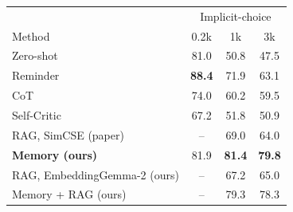 \begin{tabular}{l|ccc}
\toprule
 & \multicolumn{3}{c}{Implicit-choice} \\
Method & 0.2k & 1k & 3k \\
\midrule
Zero-shot & 81.0 & 50.8 & 47.5 \\
Reminder & \textbf{88.4} & 71.9 & 63.1 \\
CoT & 74.0 & 60.2 & 59.5 \\
Self-Critic & 67.2 & 51.8 & 50.9 \\
RAG, SimCSE (paper) & -- & 69.0 & 64.0 \\
\midrule
\textbf{Memory (ours)} & 81.9 & \textbf{81.4} & \textbf{79.8} \\
RAG, EmbeddingGemma-2 (ours) & -- & 67.2 & 65.0 \\
Memory + RAG (ours) & -- & 79.3 & 78.3 \\
\bottomrule
\end{tabular}
